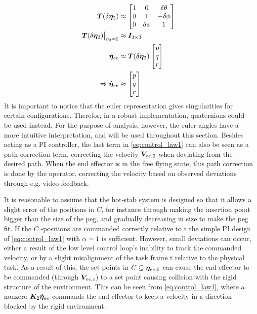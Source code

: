 \begin{align}
	\boldsymbol T(\delta \boldsymbol \eta_{2}) &\approx \begin{bmatrix} 1 & 0 & \delta \theta \\ 0 & 1 & -\delta \phi \\ 0 & \delta \phi & 1 \end{bmatrix}	
	\label{eq:linearized-transformation}
	\\
	\boldsymbol T(\delta \boldsymbol \eta_{2}) \big|_{\eta_{2}=0} &\approx \boldsymbol I_{3 \times 3}
	\label{eq:linearized-transformation2}
	\\
	\dot{\boldsymbol \eta}_{ee}&\approx\boldsymbol T(\delta \boldsymbol \eta_{2}) \begin{bmatrix} p \\ q \\ r\end{bmatrix}
	\\
	\Rightarrow \dot{\boldsymbol \eta}_{ee}&\approx \begin{bmatrix} p \\ q\\  r\end{bmatrix}
\end{align}
It is important to notice that the euler representation gives singularities for certain configurations. Therefor, in a robust implementation, quaternions could be used instead. For the purpose of analysis, however, the euler angles have a more intuitive interpretation, and will be used throughout this section.
Besides acting as a PI controller, the last term in \eqref{eq:control_law1} can also be seen as a path correction term, correcting the velocity $\boldsymbol V_{ee,0}$ when deviating from the desired path. When the end effector is in the free flying state, this path correction is done by the operator, correcting the velocity based on observed deviations through e.g. video feedback. 

It is reasonable to assume that the hot-stab system is designed so that it allows a slight error of the positions in $C$, for instance through making the insertion point bigger than the size of the peg, and gradually decreasing in size to make the peg fit. If the $C$ -positions are commanded correctly relative to \frame t the simple PI design of \ref{eq:control_law1} with $\alpha=1$ is sufficient. However, small deviations can occur, either a result of the low level control loop's inability to track the commanded velocity, or by a slight misalignment of the task frame \frame t relative to the physical task. As a result of this, the set points in $C \subseteq \boldsymbol \eta_{ee,0}$ can cause the end effector to be commanded (through $\boldsymbol V_{ee,c}$) to a set point causing collision with the rigid structure of the environment. This can be seen from \eqref{eq:control_law1}, where a nonzero $\boldsymbol K_{2}\tilde{\boldsymbol \eta}_{ee}$ commands the end effector to keep a velocity in a direction blocked by the rigid environment.

